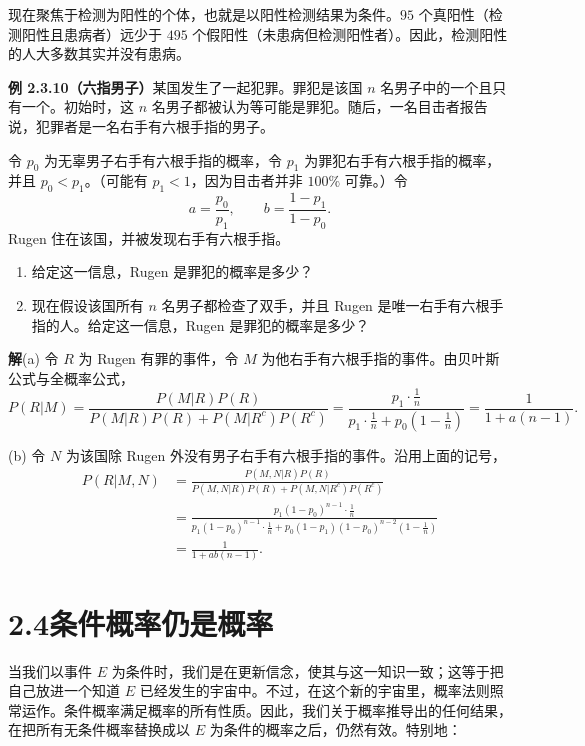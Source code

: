 \documentclass[UTF8, 12pt, fontset=fandol, oneside]{ctexart}
\begin{document}
现在聚焦于检测为阳性的个体，也就是以阳性检测结果为条件。$95$ 个真阳性（检测阳性且患病者）远少于 $495$ 个假阳性（未患病但检测阳性者）。因此，检测阳性的人大多数其实并没有患病。

\noindent\textbf{例 2.3.10（六指男子）}\quad 某国发生了一起犯罪。罪犯是该国 $n$ 名男子中的一个且只有一个。初始时，这 $n$ 名男子都被认为等可能是罪犯。随后，一名目击者报告说，犯罪者是一名右手有六根手指的男子。

令 $p_0$ 为无辜男子右手有六根手指的概率，令 $p_1$ 为罪犯右手有六根手指的概率，并且 $p_0<p_1$。（可能有 $p_1<1$，因为目击者并非 $100\%$ 可靠。）令
\[
  a=\frac{p_0}{p_1},\qquad b=\frac{1-p_1}{1-p_0}.
\]
Rugen 住在该国，并被发现右手有六根手指。

\begin{enumerate}
  \item[(a)] 给定这一信息，Rugen 是罪犯的概率是多少？
  \item[(b)] 现在假设该国所有 $n$ 名男子都检查了双手，并且 Rugen 是唯一右手有六根手指的人。给定这一信息，Rugen 是罪犯的概率是多少？
\end{enumerate}

\noindent\textbf{解}\quad (a) 令 $R$ 为 Rugen 有罪的事件，令 $M$ 为他右手有六根手指的事件。由贝叶斯公式与全概率公式，
\[
  P(R|M)
  =
  \frac{P(M|R)P(R)}
       {P(M|R)P(R)+P(M|R^c)P(R^c)}
  =
  \frac{p_1\cdot \frac1n}
       {p_1\cdot \frac1n+p_0(1-\frac1n)}
  =
  \frac{1}{1+a(n-1)}.
\]

(b) 令 $N$ 为该国除 Rugen 外没有男子右手有六根手指的事件。沿用上面的记号，
\[
\begin{aligned}
  P(R|M,N)
  &=
  \frac{P(M,N|R)P(R)}
       {P(M,N|R)P(R)+P(M,N|R^c)P(R^c)} \\
  &=
  \frac{p_1(1-p_0)^{n-1}\cdot \frac1n}
       {p_1(1-p_0)^{n-1}\cdot \frac1n
        +p_0(1-p_1)(1-p_0)^{n-2}(1-\frac1n)} \\
  &=
  \frac{1}{1+ab(n-1)}.
\end{aligned}
\]

\section*{2.4\quad 条件概率仍是概率}

当我们以事件 $E$ 为条件时，我们是在更新信念，使其与这一知识一致；这等于把自己放进一个知道 $E$ 已经发生的宇宙中。不过，在这个新的宇宙里，概率法则照常运作。条件概率满足概率的所有性质。因此，我们关于概率推导出的任何结果，在把所有无条件概率替换成以 $E$ 为条件的概率之后，仍然有效。特别地：
\end{document}
